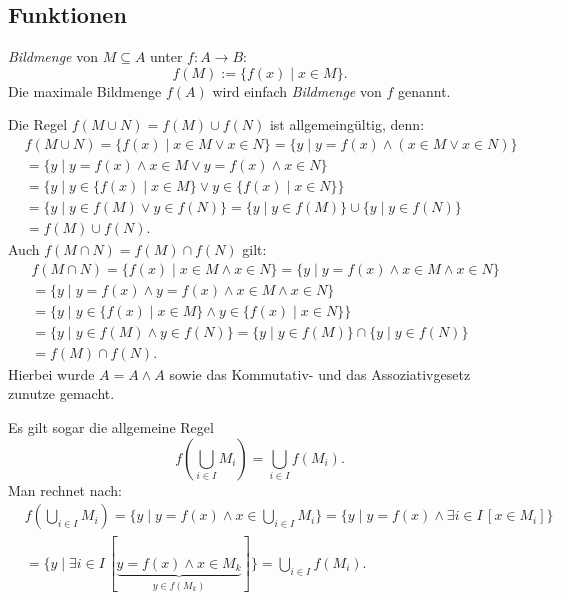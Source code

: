 \documentclass[a4paper,11pt,fleqn,twoside]{scrartcl}
\numberwithin{equation}{section}
\newcommand{\strong}[1]{{\sf\bfseries #1}}
\newenvironment{Definition}{\par\noindent\strong{Definition.}}{\par}
\newcommand{\emdef}[1]{\emph{#1}}
\begin{document}
\subsection{Funktionen}
\begin{Definition}
\emph{Bildmenge} von $M\subseteq A$ unter $f\colon A\to B$:
\begin{equation}
f(M) := \{f(x)\mid x\in M\}.
\end{equation}
Die maximale Bildmenge $f(A)$ wird einfach \emdef{Bildmenge} von $f$ genannt.
\end{Definition}
Die Regel $f(M\cup N)=f(M)\cup f(N)$ ist allgemeingültig, denn:
\begin{align}
&f(M\cup N) = \{f(x)\mid x\in M\lor x\in N\}
= \{y\mid y=f(x)\land(x\in M\lor x\in N)\}\\
&= \{y\mid y=f(x)\land x\in M\lor y=f(x)\land x\in N\}\\
&= \{y\mid y\in\{f(x)\mid x\in M\}\lor y\in\{f(x)\mid x\in N\}\}\\
&= \{y\mid y\in f(M)\lor y\in f(N)\}
= \{y\mid y\in f(M)\}\cup \{y\mid y\in f(N)\}\\
&= f(M)\cup f(N).
\end{align}
Auch $f(M\cap N)=f(M)\cap f(N)$ gilt:
\begin{align}
&f(M\cap N) = \{f(x)\mid x\in M\land x\in N\}
= \{y\mid y=f(x)\land x\in M\land x\in N\}\\
&= \{y\mid y=f(x)\land y=f(x)\land x\in M\land x\in N\}\\
&= \{y\mid y\in\{f(x)\mid x\in M\}\land y\in\{f(x)\mid x\in N\}\}\\
&= \{y\mid y\in f(M)\land y\in f(N)\}
= \{y\mid y\in f(M)\}\cap \{y\mid y\in f(N)\}\\
&= f(M)\cap f(N).
\end{align}
Hierbei wurde $A=A\land A$ sowie das Kommutativ- und das
Assoziativgesetz zunutze gemacht.

Es gilt sogar die allgemeine Regel
\begin{equation}
f(\bigcup_{i\in I} M_i) = \bigcup_{i\in I} f(M_i).
\end{equation}
Man rechnet nach:
\begin{align}
&f(\bigcup_{i\in I} M_i)
= \{y\mid y=f(x)\land x\in\bigcup_{i\in I} M_i\}
= \{y\mid y=f(x)\land\exists i{\in}I\,[x\in M_i]\}\\
&= \{y\mid\exists i{\in}I\,[\underbrace{y=f(x)\land x\in M_k}_{y\in f(M_k)}]\}
= \bigcup_{i\in I} f(M_i).
\end{align}
\end{document}
